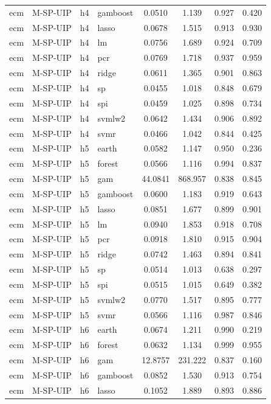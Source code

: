 \begin{ThreePartTable}
\begin{longtable}[t]{llclcccc}
ecm & M-SP-UIP & h4 & gamboost & 0.0510 & 1.139 & 0.927 & 0.420\\
ecm & M-SP-UIP & h4 & lasso & 0.0678 & 1.515 & 0.913 & 0.930\\
ecm & M-SP-UIP & h4 & lm & 0.0756 & 1.689 & 0.924 & 0.709\\
ecm & M-SP-UIP & h4 & pcr & 0.0769 & 1.718 & 0.937 & 0.959\\
ecm & M-SP-UIP & h4 & ridge & 0.0611 & 1.365 & 0.901 & 0.863\\
ecm & M-SP-UIP & h4 & sp & 0.0455 & 1.018 & 0.848 & 0.679\\
ecm & M-SP-UIP & h4 & spi & 0.0459 & 1.025 & 0.898 & 0.734\\
ecm & M-SP-UIP & h4 & svmlw2 & 0.0642 & 1.434 & 0.906 & 0.892\\
ecm & M-SP-UIP & h4 & svmr & 0.0466 & 1.042 & 0.844 & 0.425\\
\addlinespace
ecm & M-SP-UIP & h5 & earth & 0.0582 & 1.147 & 0.950 & 0.236\\
ecm & M-SP-UIP & h5 & forest & 0.0566 & 1.116 & 0.994 & 0.837\\
ecm & M-SP-UIP & h5 & gam & 44.0841 & 868.957 & 0.838 & 0.845\\
ecm & M-SP-UIP & h5 & gamboost & 0.0600 & 1.183 & 0.919 & 0.643\\
ecm & M-SP-UIP & h5 & lasso & 0.0851 & 1.677 & 0.899 & 0.901\\
ecm & M-SP-UIP & h5 & lm & 0.0940 & 1.853 & 0.918 & 0.708\\
ecm & M-SP-UIP & h5 & pcr & 0.0918 & 1.810 & 0.915 & 0.904\\
ecm & M-SP-UIP & h5 & ridge & 0.0742 & 1.463 & 0.894 & 0.841\\
ecm & M-SP-UIP & h5 & sp & 0.0514 & 1.013 & 0.638 & 0.297\\
ecm & M-SP-UIP & h5 & spi & 0.0515 & 1.015 & 0.649 & 0.382\\
ecm & M-SP-UIP & h5 & svmlw2 & 0.0770 & 1.517 & 0.895 & 0.777\\
ecm & M-SP-UIP & h5 & svmr & 0.0566 & 1.116 & 0.987 & 0.846\\
\addlinespace
ecm & M-SP-UIP & h6 & earth & 0.0674 & 1.211 & 0.990 & 0.219\\
ecm & M-SP-UIP & h6 & forest & 0.0632 & 1.134 & 0.999 & 0.955\\
ecm & M-SP-UIP & h6 & gam & 12.8757 & 231.222 & 0.837 & 0.160\\
ecm & M-SP-UIP & h6 & gamboost & 0.0852 & 1.530 & 0.913 & 0.754\\
ecm & M-SP-UIP & h6 & lasso & 0.1052 & 1.889 & 0.893 & 0.886\\

\end{longtable}
\end{ThreePartTable}
